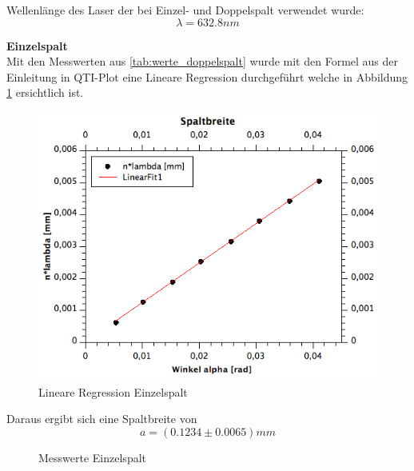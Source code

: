 \documentclass[12pt,a4paper]{article}
\begin{document}
\begin{multicols}{2}
\noindent
Wellenlänge des Laser der bei Einzel- und Doppelspalt verwendet wurde:
$$\lambda = 632.8nm$$

\textbf{Einzelspalt}\\
Mit den Messwerten aus \ref{tab:werte_doppelspalt} wurde mit den Formel aus der Einleitung in QTI-Plot eine Lineare Regression durchgeführt welche in Abbildung \ref{fig:einzelspalt_linreg} ersichtlich ist. 
\begin{figure}[H]
	\centering
	\includegraphics[scale=0.4]{./figure/linreg_einzelspalt.png}
	\caption{Lineare Regression Einzelspalt}
	\label{fig:einzelspalt_linreg}
\end{figure}
Daraus ergibt sich eine Spaltbreite von 
$$a = (0.1234 \pm 0.0065)mm$$
\begin{figure}[H]
	\centering
	\caption{Messwerte Einzelspalt}
	\label{tab:werte_einzelspalt}
\end{figure}


\end{multicols}
\end{document}
